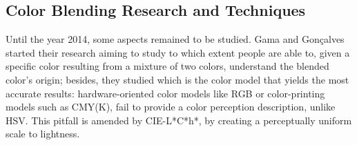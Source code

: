 \subsection{Color Blending Research and Techniques}
\label{subsec:colorblending}
%
Until the year 2014, some aspects remained to be studied. Gama and Gonçalves started their research \cite{Gama20141}
aiming to study to which extent people are able to, given a specific color resulting from a mixture of
two colors, understand the blended color’s origin; besides, they studied which is the color model that
yields the most accurate results: hardware-oriented color models like RGB or color-printing models such
as CMY(K), fail to provide a color perception description, unlike HSV. This pitfall is amended by CIE-L*C*h*,
by creating a perceptually uniform scale to lightness.  \par
%

